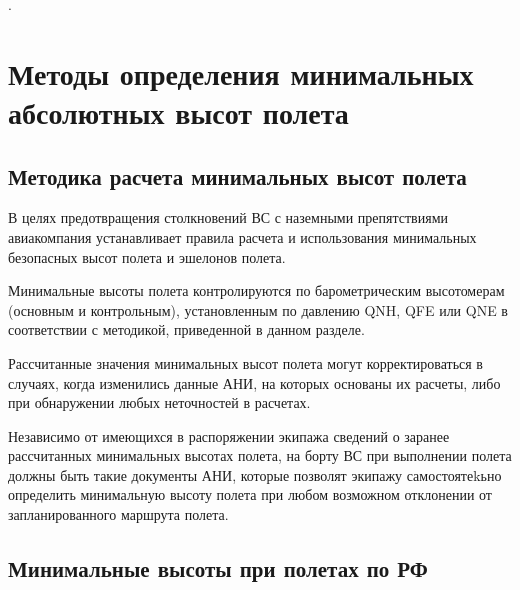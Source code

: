 %

\begin{appendix}

    \pagestyle{fancy}
    \tableofcontents
    \setlength{\headheight}{22pt}.
    \addtolength{\topmargin}{-2pt}


\section{Методы определения минимальных абсолютных высот полета}    
\subsection{Методика расчета минимальных высот полета}

\setcounter{subsect}{0}

 В целях предотвращения столкновений ВС с наземными препятствиями авиакомпания устанавливает правила расчета и использования минимальных безопасных высот полета и эшелонов полета.

 Минимальные высоты полета контролируются по барометрическим высотомерам (основным и контрольным), установленным по давлению QNH, QFE или QNE в соответствии с методикой, приведенной в данном разделе. 

 Рассчитанные значения минимальных высот полета могут корректироваться в случаях, когда изменились данные АНИ, на которых основаны их расчеты, либо при обнаружении любых неточностей в расчетах.




 Независимо от имеющихся в распоряжении экипажа сведений о заранее рассчитанных минимальных высотах полета, на борту ВС при выполнении полета должны быть такие документы АНИ, которые позволят экипажу самостоятеkьно определить минимальную высоту полета при любом возможном отклонении от запланированного маршрута полета.
 
    \subsection{Минимальные высоты при полетах по РФ}
    \setcounter{subsect}{0}
    

\end{appendix}
